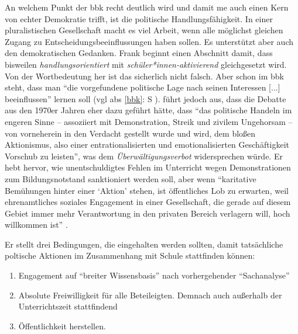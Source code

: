 An welchem Punkt der \gls{bbk} recht deutlich wird und damit \gls{me} auch einen Kern von echter Demokratie trifft, ist die politische Handlungsfähigkeit. In einer pluralistischen Gesellschaft macht es viel Arbeit, wenn alle möglichst gleichen Zugang zu Entscheidungsbeeinflussungen haben sollen. Es unterstützt aber auch den demokratischen Gedanken. 
Frank \textcite[466]{Nonnenmacher2010} beginnt einen Abschnitt damit, dass bisweilen \emph{handlungsorientiert} mit \emph{schüler*innen-aktivierend} gleichgesetzt wird. Von der Wortbedeutung her ist das sicherlich nicht falsch. Aber schon im \gls{bbk} steht, dass man \enquote{die vorgefundene politische Lage nach seinen %
Interessen [...] beeinflussen} lernen soll (\gls{vgl} \gls{abs} \ref{bbk}: \gls{S} \pageref{bbk}). \textcite[466-467]{Nonnenmacher2010} führt jedoch aus, dass die Debatte aus den 1970er Jahren eher dazu geführt hätte, dass \enquote{das politische Handeln im engeren Sinne -- assoziiert mit Demonstration, Streik und zivilem Ungehorsam -- von vorneherein in den Verdacht gestellt wurde und wird, dem bloßen Aktionismus, also einer entrationalisierten und emotionalisierten Geschäftigkeit Vorschub zu leisten}, was dem \emph{Überwältigungsverbot} widersprechen würde.
Er hebt hervor, wie unentschuldigtes Fehlen im Unterricht wegen Demonstrationen zum Bildungsnotstand sanktioniert werden soll, aber wenn \enquote{karitative Bemühungen hinter einer \enquote{Aktion} stehen, ist öffentliches Lob zu erwarten, weil ehrenamtliches soziales Engagement in einer Gesellschaft, die gerade auf diesem Gebiet immer mehr Verantwortung in den privaten Bereich verlagern will, hoch willkommen ist} \autocite[467]{Nonnenmacher2010}.

Er stellt drei Bedingungen, die eingehalten werden sollten, damit tatsächliche poltische Aktionen im Zusammenhang mit Schule stattfinden können:
\begin{enumerate}
    \item Engagement auf \enquote{breiter Wissensbasis} nach vorhergehender \enquote{Sachanalyse}
    \item Absolute Freiwilligkeit für alle Beteileigten. Demnach auch außerhalb der Unterrichtszeit stattfindend
    \item Öffentlichkeit herstellen. %
    
    \autocite[467]{Nonnenmacher2010}
\end{enumerate}


